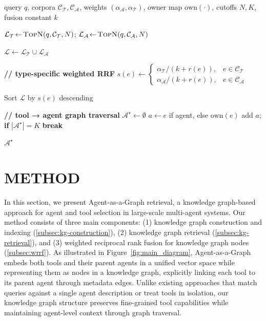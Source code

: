\documentclass[a4paper,twoside]{article}
\begin{document}
\begin{algorithm}
\footnotesize
\caption{\small Agent-as-a-Graph Retrieval}
\label{alg:aag}
\begin{algorithmic}[1]

\Require query $q$, corpora $\mathcal{C_T},\mathcal{C_A}$, 
weights $(\alpha_{\mathcal{A}},\alpha_{\mathcal{T}})$,
owner map $\mathrm{own}(\cdot)$, cutoffs $N,K$, fusion constant $k$

\State $\mathcal{L_T}\!\gets\!\textsc{TopN}(q,\mathcal{C_T},N)$;\;
       $\mathcal{L_A}\!\gets\!\textsc{TopN}(q,\mathcal{C_A},N)$

\State $\mathcal{L}\!\gets\!\mathcal{L_T}\cup\mathcal{L_A}$

\State \textbf{// type-specific weighted RRF}
    \State $s(e)\gets 
        \begin{cases}
        \alpha_{\mathcal{T}}\!/\!(k+r(e)), & e\in\mathcal{C_T}\\
        \alpha_{\mathcal{A}}\!/\!(k+r(e)), & e\in\mathcal{C_A}
        \end{cases}$
\EndFor

\State Sort $\mathcal{L}$ by $s(e)$ descending

\State \textbf{// tool → agent graph traversal}
\State $\mathcal{A}^\star\gets\emptyset$
    \State $a \gets e$ if agent, else $\mathrm{own}(e)$
         \State add $a$; \textbf{if} $|\mathcal{A}^\star|\!=\!K$ \textbf{break}
    \EndIf
\EndFor

\State \Return $\mathcal{A}^\star$

\end{algorithmic}
\end{algorithm}





\section{\uppercase{Method}}

In this section, we present Agent-as-a-Graph retrieval, a knowledge graph-based approach for agent and tool selection in large-scale multi-agent systems. Our method consists of three main components: (1) knowledge graph construction and indexing (\ref{subsec:kg-construction}), (2) knowledge graph retrieval (\ref{subsec:kg-retrieval}), and (3) weighted reciprocal rank fusion for knowledge graph nodes (\ref{subsec:wrrf}). As illustrated in Figure~\ref{fig:main_diagram}, Agent-as-a-Graph embeds both tools and their parent agents in a unified vector space while representing them as nodes in a knowledge graph, explicitly linking each tool to its parent agent through metadata edges. Unlike existing approaches that match queries against a single agent description or treat tools in isolation, our knowledge graph structure preserves fine-grained tool capabilities while maintaining agent-level context through graph traversal.
\end{document}

